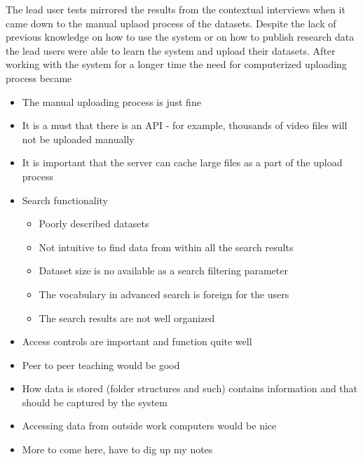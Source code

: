The lead user tests mirrored the results from the contextual interviews when
it came down to the manual uplaod process of the datasets. Despite the lack of
previous knowledge on how to use the system or on how to publish research data
the lead users were able to learn the system and upload their datasets. After
working with the system for a longer time the need for computerized uploading
process became 

\begin{itemize}
    \item The manual uploading process is just fine
    \item It is a must that there is an API - for example, thousands of video
          files will not be uploaded manually
    \item It is important that the server can cache large files as a part of
          the upload process
    \item Search functionality
        \begin{itemize}
            \item Poorly described datasets
            \item Not intuitive to find data from within all the search results
            \item Dataset size is no available as a search filtering parameter
            \item The vocabulary in advanced search is foreign for the users
            \item The search results are not well organized
        \end{itemize}
    \item Access controls are important and function quite well
    \item Peer to peer teaching would be good
    \item How data is stored (folder structures and such) contains information
          and that should be captured by the system
    \item Accessing data from outside work computers would be nice
    \item More to come here, have to dig up my notes
\end{itemize}
